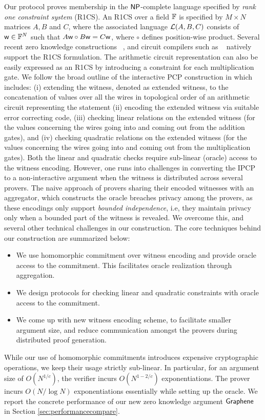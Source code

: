 Our protocol proves membership in the $\mathsf{NP}$-complete
language specified by {\em rank one constraint system} (R1CS). An R1CS over a
field $\mathbb{F}$ is specified by $M\times N$ matrices $A,B$ and $C$, where the
associated language $\mathcal{L}(A,B,C)$ consists of $\mathsf{w}\in \mathbb{F}^N$ such that
$A\mathsf{w}\circ B\mathsf{w}=C\mathsf{w}$, where $\circ$ defines position-wise product. Several
recent zero knowledge constructions ~\cite{Groth16,aurora,marlin}, and 
circuit compilers such as ~\cite{zokrates} natively support the R1CS formulation. 
The arithmetic circuit representation can also be easily
expressed as an R1CS by introducing a constraint for each multiplication gate.
We follow the broad outline of the interactive PCP
construction in \cite{ligero} which includes: (i) extending the witness, denoted as extended witness, to the concatenation of values over all the wires in topological order of an arithmetic circuit  representing the statement   (ii) encoding the extended witness via suitable
error correcting code, (iii) checking linear relations on the extended witness (for the values concerning the wires going into and coming out from the addition gates), and
(iv) checking quadratic relations on
the extended witness  (for the values concerning the wires going into and coming out from the multiplication gates). Both the linear and quadratic checks require sub-linear (oracle) access to the 
witness encoding.
However, one runs into 
challenges in converting the IPCP to a non-interactive
argument when the witness is distributed across several provers. The naive
approach of provers sharing their encoded witnesses with an aggregator, which
constructs the oracle breaches privacy among the provers, as these encodings
only support {\em bounded independence}, i.e, they maintain privacy only when a
bounded part of the witness is revealed. We overcome this, and several other
technical challenges in our construction. The core techniques behind our
construction are summarized below:
\begin{itemize}
\item We use homomorphic commitment over witness encoding and provide oracle
access to the commitment. This facilitates oracle realization through
aggregation.
\item We design protocols for checking linear and quadratic constraints
with oracle access to the commitment.
\item We come up with new witness encoding scheme, to facilitate smaller
argument size, and reduce communication amongst the provers during distributed proof
generation.
\end{itemize}
While our use of homomorphic commitments introduces expensive cryptographic
operations, we keep their usage strictly sub-linear. In particular, for an
argument size of $O(N^{1/c})$, the verifier 
incurs $O(N^{1-2/c})$ exponentiations. The prover incurs
$O(N/\log N)$ exponentiations essentially while
setting up the oracle. We report the concrete performance of our new zero
knowledge argument $\textsf{Graphene}$ in Section
\ref{sec:performancecompare}.
